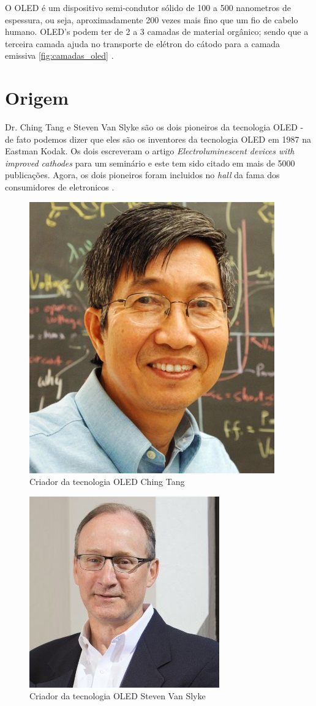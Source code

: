 O OLED é um dispositivo semi-condutor sólido de 100 a 500 nanometros de espessura, ou seja, aproximadamente 200 vezes mais fino que um fio de cabelo humano. OLED's podem ter de 2 a 3 camadas de material orgânico; sendo que a terceira camada ajuda no transporte de elétron do cátodo para a camada emissiva \ref{fig:camadas_oled} \cite{HSWOLED}.

\section{Origem}
\label{sec:camadas}

Dr. Ching Tang e Steven Van Slyke são os dois pioneiros da tecnologia OLED - de fato podemos dizer que eles são os inventores da tecnologia OLED em 1987 na Eastman Kodak. Os dois escreveram o artigo \textit{Electroluminescent devices with improved cathodes} para um seminário e este tem sido citado em mais de 5000 publicações. Agora, os dois pioneiros foram incluidos no \textit{hall} da fama dos consumidores de eletronicos \cite{OLEDPioneers}. 

\begin{figure}[!h]
  \centering
  \includegraphics[width=.40\textwidth]{./figuras/ching_tang} 
  \caption{Criador da tecnologia OLED Ching Tang}
  \label{fig:ching_tang} 
\end{figure}

\begin{figure}[!h]
  \centering
  \includegraphics[width=.40\textwidth]{./figuras/steven_slyke} 
  \caption{Criador da tecnologia OLED Steven Van Slyke}
  \label{fig:steven_slyke} 
\end{figure}


